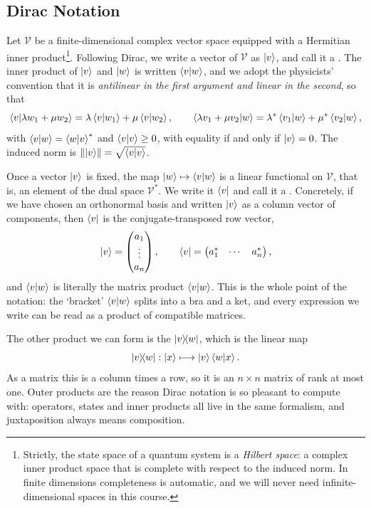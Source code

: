 \documentclass[a4paper]{scrartcl}
\newcommand{\Vs}{\mathcal{V}}
\begin{document}
\subsection{Dirac Notation}\label{sec:dirac}

Let $\Vs$ be a finite-dimensional complex vector space equipped with a Hermitian inner product\footnote{Strictly, the state space of a quantum system is a \emph{Hilbert space}: a complex inner product space that is complete with respect to the induced norm. In finite dimensions completeness is automatic, and we will never need infinite-dimensional spaces in this course.}. Following Dirac, we write a vector of $\Vs$ as $\ket{v}$, and call it a . The inner product of $\ket{v}$ and $\ket{w}$ is written $\ip{v}{w}$, and we adopt the physicists' convention that it is \emph{antilinear in the first argument and linear in the second}, so that
$$\ip{v}{\lambda w_1 + \mu w_2} = \lambda\ip{v}{w_1} + \mu \ip{v}{w_2}, \qquad \ip{\lambda v_1 + \mu v_2}{w} = \lambda^*\ip{v_1}{w} + \mu^*\ip{v_2}{w},$$
with $\ip{v}{w} = \ip{w}{v}^*$ and $\ip{v}{v} \geq 0$, with equality if and only if $\ket{v} = 0$. The induced norm is $\norm{\ket{v}} = \sqrt{\ip{v}{v}}$.

Once a vector $\ket{v}$ is fixed, the map $\ket{w} \mapsto \ip{v}{w}$ is a linear functional on $\Vs$, that is, an element of the dual space $\Vs^*$. We write it $\bra{v}$ and call it a . Concretely, if we have chosen an orthonormal basis and written $\ket{v}$ as a column vector of components, then $\bra{v}$ is the conjugate-transposed row vector,
$$\ket{v} = \begin{pmatrix} a_1 \\ \vdots \\ a_n\end{pmatrix}, \qquad \bra{v} = \begin{pmatrix} a_1^* & \cdots & a_n^*\end{pmatrix},$$
and $\ip{v}{w}$ is literally the matrix product $\bra{v}\ket{w}$. This is the whole point of the notation: the `bracket' $\ip{v}{w}$ splits into a bra and a ket, and every expression we write can be read as a product of compatible matrices.

The other product we can form is the  $\op{v}{w}$, which is the linear map
$$\op{v}{w} : \ket{x} \longmapsto \ket{v}\ip{w}{x}.$$
As a matrix this is a column times a row, so it is an $n \times n$ matrix of rank at most one. Outer products are the reason Dirac notation is so pleasant to compute with: operators, states and inner products all live in the same formalism, and juxtaposition always means composition.
\end{document}
